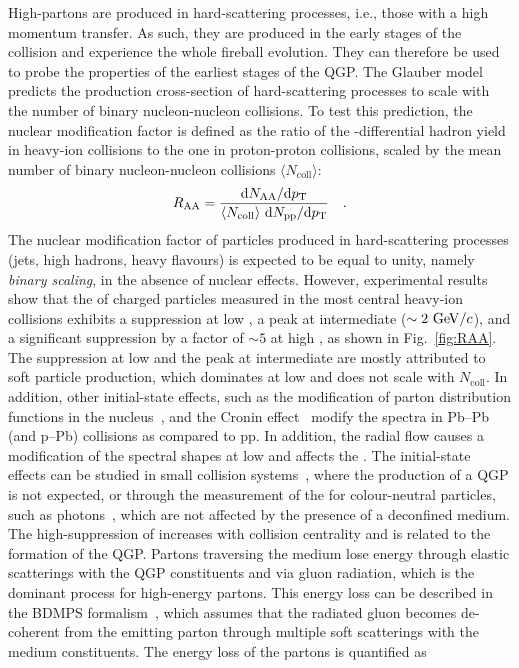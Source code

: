 High-\pt partons are produced in hard-scattering processes, i.e., those with a high momentum transfer. As such, they are produced in the early stages of the collision and experience the whole fireball evolution. They can therefore be used to probe the properties of the earliest stages of the QGP. The Glauber model predicts the production cross-section of hard-scattering processes to scale with the number of binary nucleon-nucleon collisions. To test this prediction, the nuclear modification factor \raa is defined as the ratio of the \pt-differential hadron yield in heavy-ion collisions to the one in proton-proton collisions, scaled by the mean number of binary nucleon-nucleon collisions $\langle N_\mathrm{coll} \rangle$:
\begin{equation*}
    R_\mathrm{AA} = \frac{\mathrm{d} N_\mathrm{AA}/\mathrm{d}p_\mathrm{T}}{\langle N_\mathrm{coll} \rangle~\mathrm{d} N_\mathrm{pp}/\mathrm{d}p_\mathrm{T}}\quad .
\end{equation*}
The nuclear modification factor of particles produced in hard-scattering processes (jets, high \pt hadrons, heavy flavours) is expected to be equal to unity, namely \emph{binary scaling}, in the absence of nuclear effects. However, experimental results~\cite{ALICE:2018vuu} show that the \raa of charged particles measured in the most central heavy-ion collisions exhibits a suppression at low \pt, a peak at intermediate \pt ($\sim 2~\mathrm{Ge\kern-.1emV}/c$), and a significant suppression by a factor of $\sim5$ at high \pt, as shown in Fig.~\ref{fig:RAA}. The suppression at low \pt and the peak at intermediate \pt are mostly attributed to soft particle production, which dominates at low \pt and does not scale with $N_\mathrm{coll}$. In addition, other initial-state effects, such as the modification of parton distribution functions in the nucleus~\cite{Arneodo:1992wf}, and the Cronin effect~\cite{Kopeliovich:2002yh} modify the spectra in Pb--Pb (and p--Pb) collisions as compared to pp. In addition, the radial flow causes a modification of the spectral shapes at low \pt and affects the \raa. The initial-state effects can be studied in small collision systems~\cite{PHENIX:2021dod}, where the production of a QGP is not expected, or through the measurement of the \raa for colour-neutral particles, such as photons~\cite{PHENIX:2012jbv}, which are not affected by the presence of a deconfined medium. The high-\pt suppression of \raa increases with collision centrality and is related to the formation of the QGP. Partons traversing the medium lose energy through elastic scatterings with the QGP constituents and via gluon radiation, which is the dominant process for high-energy partons. This energy loss can be described in the BDMPS formalism~\cite{Baier:1996kr}, which assumes that the radiated gluon becomes de-coherent from the emitting parton through multiple soft scatterings with the medium constituents. The energy loss of the partons is quantified as

